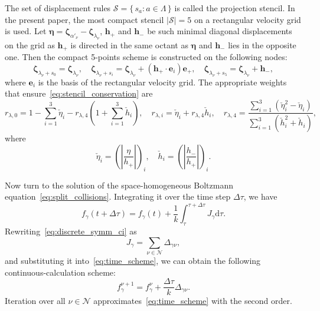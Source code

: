 \documentclass[review]{elsarticle}
\newcommand{\dd}{\mathrm{d}}
\newcommand{\bzeta}{\boldsymbol{\zeta}}
\newcommand{\bh}{\boldsymbol{h}}
\newcommand{\Nu}{\mathcal{N}}
\newcommand{\Set}[2]{\{\,{#1}:{#2}\,\}}
\begin{document}
The set of displacement rules \(\mathcal{S} = \Set{s_a}{a\in\Lambda}\)
is called the projection stencil.
In the present paper, the most compact stencil \(|\mathcal{S}|=5\) on a rectangular velocity grid is used.
Let \(\boldsymbol{\eta} = \bzeta_{\alpha'_\nu} - \bzeta_{\lambda_\nu}\),
\(\bh_+\) and \(\bh_-\) be such minimal diagonal displacements on the grid
as \(\bh_+\) is directed in the same octant as \(\boldsymbol{\eta}\)
and \(\bh_-\) lies in the opposite one.
Then the compact 5-points scheme is constructed on the following nodes:
\begin{equation}\label{eq:stencil_nodes}
    \bzeta_{\lambda_\nu+s_0} = \bzeta_{\lambda_\nu}, \quad
    \bzeta_{\lambda_\nu+s_i} = \bzeta_{\lambda_\nu} + (\bh_+\cdot \boldsymbol{e}_i)\boldsymbol{e}_+, \quad
    \bzeta_{\lambda_\nu+s_5} = \bzeta_{\lambda_\nu} + \bh_-,
\end{equation}
where \(\boldsymbol{e}_i\) is the basis of the rectangular velocity grid.
The appropriate weights that ensure~\eqref{eq:stencil_conservation} are
\begin{equation}\label{eq:stencil_weights}
    r_{\lambda,0} = 1 - \sum_{i=1}^3 \check{\eta}_i - r_{\lambda,4}\left(1+\sum_{i=1}^3 \check{h}_i\right), \quad
    r_{\lambda,i} = \check{\eta}_i + r_{\lambda,4}\check{h}_i, \quad
    r_{\lambda,4} = \frac{\displaystyle\sum_{i=1}^3(\check{\eta}_i^2 - \check{\eta}_i)}
        {\displaystyle\sum_{i=1}^3(\check{h}_i^2 + \check{h}_i)},
\end{equation}
where
\begin{equation}\label{eq:stencil_variables}
    \check{\eta}_i = \left(\left|\frac{\eta}{h_+}\right|\right)_i, \quad
    \check{h}_i = \left(\left|\frac{h_-}{h_+}\right|\right)_i.
\end{equation}

Now turn to the solution of the space-homogeneous Boltzmann equation~\eqref{eq:split_collisions}.
Integrating it over the time step \(\Delta\tau\), we have
\begin{equation}\label{eq:time_scheme}
    f_\gamma(t+\Delta\tau) = f_\gamma(t) + \frac1k \int_\tau^{\tau+\Delta\tau} J_\gamma \dd\tau.
\end{equation}
Rewriting~\eqref{eq:discrete_symm_ci} as
\begin{equation}\label{eq:discrete_short_ci}
    J_\gamma = \sum_{\nu\in\Nu} \Delta_{\gamma\nu},
\end{equation}
and substituting it into~\eqref{eq:time_scheme},
we can obtain the following continuous-calculation scheme:
\begin{equation}\label{eq:continuous_scheme}
    f_\gamma^{\nu+1} = f_\gamma^\nu + \frac{\Delta\tau}{k}\Delta_{\gamma\nu}.
\end{equation}
Iteration over all \(\nu\in\Nu\) approximates~\eqref{eq:time_scheme}
with the second order.
\end{document}
